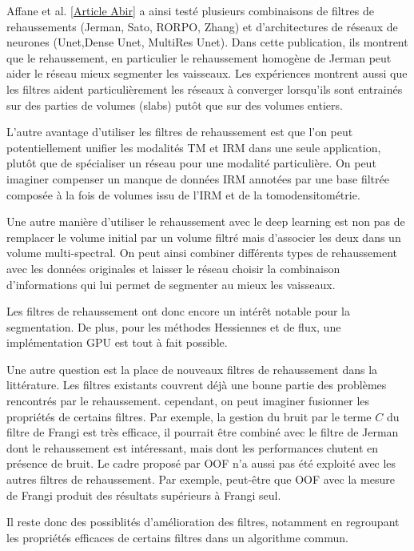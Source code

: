 
Affane et al. \ref{Article Abir} a ainsi testé plusieurs combinaisons de filtres de rehaussements (Jerman, Sato, RORPO, Zhang) et d'architectures de réseaux de neurones (Unet,Dense Unet, MultiRes Unet). Dans cette publication, ils montrent que le rehaussement, en particulier le rehaussement homogène de Jerman peut aider le réseau mieux segmenter les vaisseaux. Les expériences montrent aussi que les filtres aident particulièrement les réseaux à converger lorsqu'ils sont entrainés sur des parties de volumes (slabs) putôt que sur des volumes entiers.

L'autre avantage d'utiliser les filtres de rehaussement est que l'on peut potentiellement unifier les modalités TM et IRM dans une seule application, plutôt que de spécialiser un réseau pour une modalité particulière. On peut imaginer compenser un manque de données IRM annotées par une base filtrée composée à la fois de volumes issu de l'IRM et de la tomodensitométrie.

Une autre manière d'utiliser le rehaussement avec le deep learning est non pas de remplacer le volume initial par un volume filtré mais d'associer les deux dans un volume multi-spectral. On peut ainsi combiner différents types de rehaussement avec les données originales et laisser le réseau choisir la combinaison d'informations qui lui permet de segmenter au mieux les vaisseaux.

Les filtres de rehaussement ont donc encore un intérêt notable pour la segmentation. De plus, pour les méthodes Hessiennes et de flux, une implémentation GPU est tout à fait possible. 

Une autre question est la place de nouveaux filtres de rehaussement dans la littérature. Les filtres existants couvrent déjà une bonne partie des problèmes rencontrés par le rehaussement. cependant, on peut imaginer fusionner les propriétés de certains filtres. Par exemple, la gestion du bruit par le terme $C$ du filtre de Frangi est très efficace, il pourrait être combiné avec le filtre de Jerman dont le rehaussement est intéressant, mais dont les performances chutent en présence de bruit. Le cadre proposé par OOF n'a aussi pas été exploité avec les autres filtres de rehaussement. Par exemple, peut-être que OOF avec la mesure de Frangi produit des résultats supérieurs à Frangi seul.

Il reste donc des possiblités d'amélioration des filtres, notamment en regroupant les propriétés efficaces de certains filtres dans un algorithme commun.

